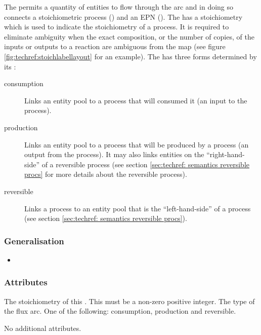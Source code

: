 The  permits a quantity of entities to flow through
the arc and in doing so connects a stoichiometric process
() and an EPN
(). The  has a
stoichiometry which is used to indicate the stoichiometry of a
process. It is required to eliminate ambiguity when the exact
composition, or the number of copies, of the inputs or outputs to a
reaction are ambiguous from the map (see figure
\ref{fig:techref:stoichlabellayout} for an example). The 
has three forms determined by its :

\begin{description}
\item[consumption] Links an entity pool to a process that will
  consumed it (an input to the process).
\item[production] Links an entity pool to a process that will be
produced by a process (an output from the process). It may also
links entities on the ``right-hand-side'' of a reversible process (see
section \ref{sec:techref: semantics reversible procs} for more details about the
reversible process).
\item[reversible] Links a process to an entity pool that is the
  ``left-hand-side'' of a process (see section  \ref{sec:techref: semantics reversible procs}).
\end{description}

\subsubsection{Generalisation}

\begin{itemize}
\item {}
\end{itemize}

\subsubsection{Attributes}

\begin{attributes}
   The stoichiometry of this
  . This must be a non-zero positive integer.
   The type of the flux arc. One of the
  following: consumption, production and reversible.
\end{attributes}

No additional attributes.

